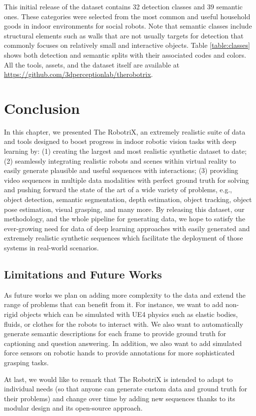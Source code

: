 This initial release of the dataset contains 32 detection classes and 39 semantic ones. These categories were selected from the most common and useful household goods in indoor environments for social robots. Note that semantic classes include structural elements such as walls that are not usually targets for detection that commonly focuses on relatively small and interactive objects. Table \ref{table:classes} shows both detection and semantic splits with their associated codes and colors. All the tools, assets, and the dataset itself are available at \url{https://github.com/3dperceptionlab/therobotrix}.

\section{Conclusion}
\label{cha:sim2real:sec:conclusion}

In this chapter, we presented The RobotriX, an extremely realistic suite of data and tools designed to boost progress in indoor robotic vision tasks with deep learning by: (1) creating the largest and most realistic synthetic dataset to date; (2) seamlessly integrating realistic robots and scenes within virtual reality to easily generate plausible and useful sequences with interactions; (3) providing video sequences in multiple data modalities with perfect ground truth for solving and pushing forward the state of the art of a wide variety of problems, e.g., object detection, semantic segmentation, depth estimation, object tracking, object pose estimation, visual grasping, and many more. By releasing this dataset, our methodology, and the whole pipeline for generating data, we hope to satisfy the ever-growing need for data of deep learning approaches with easily generated and extremely realistic synthetic sequences which facilitate the deployment of those systems in real-world scenarios. 

\subsection{Limitations and Future Works}
\label{cha:sim2real:sec:conclusion:subsec:limitations}

As future works we plan on adding more complexity to the data and extend the range of problems that can benefit from it. For instance, we want to add non-rigid objects which can be simulated with \acl{UE4} physics such as elastic bodies, fluids, or clothes for the robots to interact with. We also want to automatically generate semantic descriptions for each frame to provide ground truth for captioning and question answering. In addition, we also want to add simulated force sensors on robotic hands to provide annotations for more sophisticated grasping tasks.

At last, we would like to remark that The RobotriX is intended to adapt to individual needs (so that anyone can generate custom data and ground truth for their problems) and change over time by adding new sequences thanks to its modular design and its open-source approach.